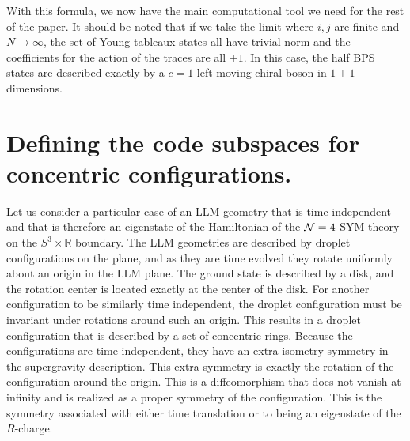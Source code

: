 \documentclass[12pt,nofootinbib, longbibliography]{revtex4-1}
\newcommand\BR{\mathbb{R}}
\begin{document}
With this formula, we now have  the main computational tool we need for the rest of the paper. It should be noted that if we take the limit where $i,j$ are finite and $N\to \infty$, the set of Young tableaux states all have trivial norm and the coefficients for the action of the traces are all $\pm 1$. In this case, the half BPS states are described exactly by a $c=1$ left-moving chiral boson in $1+1$ dimensions. 

\section{Defining the code subspaces for concentric configurations.}\label{sec:geomcode}

Let us consider a particular case of an LLM geometry that is  time independent and that is therefore an eigenstate of the Hamiltonian of the ${\cal N}=4 $  SYM theory on the $S^3\times \BR$ boundary. 
The LLM geometries are  described by  droplet configurations on the plane, and as they are time evolved they rotate uniformly about an origin in the LLM plane. The ground state is described by a disk, and the rotation center is located exactly at the center of the disk. For another configuration to be similarly time independent, the droplet configuration must be invariant under rotations around such an origin. This results in 
a droplet configuration that is described by a set of concentric rings. Because the configurations are time independent, they have an extra isometry symmetry in the supergravity description. This extra symmetry is exactly the rotation of the configuration around the origin. This is a diffeomorphism that does not vanish at infinity and is realized as a proper symmetry of the configuration. This is the symmetry associated with either time translation or to being an eigenstate of the  $R$-charge. 
\end{document}
